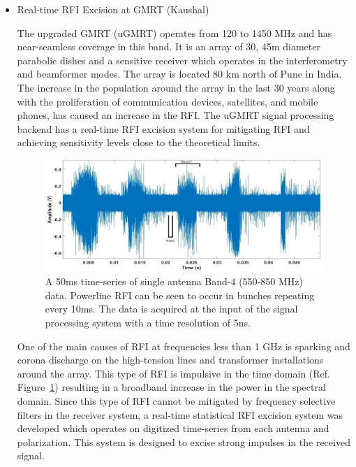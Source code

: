 \begin{itemize}
\item Real-time RFI Excision at GMRT (Kaushal)

The upgraded GMRT (uGMRT) \cite{gupta2017upgraded} operates from 120 to 1450 MHz and has near-seamless coverage in this band. It is an array of 30, 45m diameter parabolic dishes and a sensitive receiver which operates in the interferometry and beamformer modes. The array is located 80 km north of Pune in India. The increase in the population around the array in the last 30 years along with the proliferation of communication devices, satellites, and mobile phones, has caused an increase in the RFI. The uGMRT signal processing backend has a real-time RFI excision system for mitigating RFI and achieving sensitivity levels close to the theoretical limits. \\

\begin{figure}
    \centering
    \includegraphics[scale=0.7]{Hardware Excision Techniques/figures/Band4_timeseries_ed.jpg}
    \caption{A 50ms time-series of single antenna Band-4 (550-850 MHz) data. Powerline RFI can be seen to occur in bunches repeating every 10ms. The data is acquired at the input of the signal processing system with a time resolution of 5ns.}
    \label{fig:ugmrt-b4-ts}
\end{figure}

One of the main causes of RFI at frequencies less than 1 GHz is sparking and corona discharge on the high-tension lines and transformer installations around the array. This type of RFI is impulsive in the time domain (Ref. Figure~\ref{fig:ugmrt-b4-ts}) resulting in a broadband increase in the power in the spectral domain. Since this type of RFI cannot be mitigated by frequency selective filters in the receiver system, a real-time statistical RFI excision system was developed which operates on digitized time-series from each antenna and polarization. This system is designed to excise strong impulses in the received signal. \\


\end{itemize}
